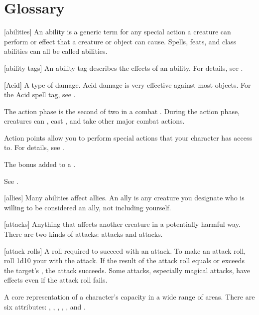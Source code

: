 \chapter{Glossary}\label{Glossary}

[abilities] An ability is a generic term for any special action a creature can perform or effect that a creature or object can cause. Spells, feats, and class abilities can all be called abilities.

[ability tags] An ability tag describes the effects of an ability.
For details, see .

[Acid] A type of damage. Acid damage is very effective against most objects. For the Acid spell tag, see .

 The action phase is the second of two  in a combat .
During the action phase, creatures can , cast , and take other major combat actions.

 Action points allow you to perform special actions that your character has access to.
For details, see .

 The bonus added to a .

 See .

[allies] Many abilities affect allies.
An ally is any creature you designate who is willing to be considered an ally, not including yourself.

[attacks] Anything that affects another creature in a potentially harmful way. There are two kinds of attacks:  attacks and  attacks.

[attack rolls] A roll required to succeed with an attack.
To make an attack roll, roll 1d10 \add your  with the attack.
If the result of the attack roll equals or exceeds the target's , the attack succeeds.
Some attacks, especially magical attacks, have effects even if the attack roll fails.

 A core representation of a character's capacity in a wide range of areas. There are six attributes: , , , , , and .

